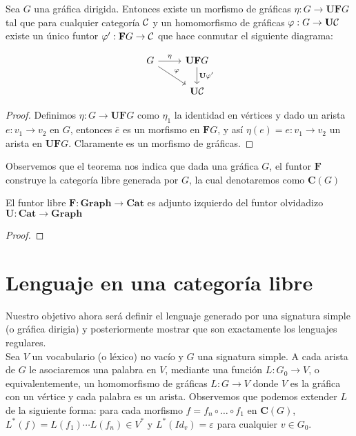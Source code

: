 \documentclass[../main.tex]{subfiles}
\begin{document}
\begin{prop}
	Sea $G$ una gráfica dirigida. Entonces existe un morfismo de gráficas $\eta:G \to \mathbf{UF}G$ tal que para cualquier categoría $\cal{C}$ y un homomorfismo de gráficas $\phi: G \to \mathbf{U}\cal{C}$ existe un único funtor $\phi': \mathbf{F}G \to \cal{C}$
	que hace conmutar el siguiente diagrama:
	
	\[
	\begin{tikzcd}
		G \arrow{r}{\eta} \arrow{rd}{\phi} & \mathbf{UF}G \arrow{d}{\mathbf{U}\phi'} \\
		& \mathbf{U}\cal{C}
	\end{tikzcd}
	\] 	
\end{prop}
\begin{proof}
	Definimos $\eta:G \to \mathbf{UF}G$ como $\eta_1$ la identidad en vértices y dado un arista $e:v_1 \to v_2$ en $G$, entonces $\bar{e}$ es un morfismo en $\mathbf{F}G$, y así $\eta(e)=e:v_1 \to v_2$ un arista en $\mathbf{UF}G$. Claramente es un morfismo de gráficas.   
\end{proof}
Observemos que el teorema nos indica que dada una gráfica $G$, el funtor $\mathbf{F}$ construye la categoría libre generada por $G$, la cual denotaremos como $\mathbf{C}(G)$
\begin{prop}
	El funtor libre $\mathbf{F: Graph \to Cat}$ es adjunto izquierdo del funtor olvidadizo $\mathbf{U: Cat \to Graph}$
\end{prop}

\begin{proof}
\end{proof}

\newpage

\section{Lenguaje en una categoría libre}
Nuestro objetivo ahora será definir el lenguaje generado por una signatura simple (o gráfica dirigia) y posteriormente mostrar que son exactamente los lenguajes regulares. \\
Sea $V$ un vocabulario (o léxico) no vacío y $G$ una signatura simple. A cada arista de $G$ le asociaremos una palabra en $V$, mediante una función $L: G_0 \to V$, o equivalentemente, un homomorfismo de gráficas $L: G \to V$ donde $V$ es la gráfica con un vértice y cada palabra es un arista. Observemos que podemos extender $L$ de la siguiente forma: para cada morfismo $f=f_n \circ \dots \circ f_1$ en \textbf{C}$(G)$, $L^*(f)=L(f_1)\cdots L(f_n) \in V^*$ y $L^*(Id_v)=\varepsilon$ para cualquier $v \in G_0$. 
\end{document}
